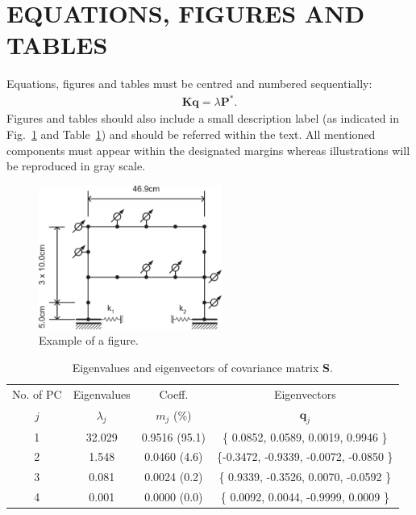\documentclass{ShortPaper_Instructions_LaTeX_IPM2019}
\begin{document}
\section{EQUATIONS, FIGURES AND TABLES}
\noindent Equations, figures and tables must be centred and numbered sequentially:
\begin{eqnarray}
	\mathbf{K q}=\lambda \mathbf{P}^\ast .
\end{eqnarray}
Figures and tables should also include a small description label (as indicated in Fig.~\ref{fig:fig1} and Table~\ref{tab:tab1}) and should be referred within the text. All mentioned components must appear within the designated margins whereas illustrations will be reproduced in gray scale.
\begin{figure}[t]
\begin{center}
\includegraphics[width=6cm]{frame_model.png}
\caption{Example of a figure.}
\label{fig:fig1}
\end{center}
\end{figure}

\begin{table}[ht]
  \begin{center}
  \caption{Eigenvalues and eigenvectors of covariance matrix \textbf{S}.}
  \label{tab:tab1}
    \begin{tabular}{*{4}{c}}
    \hline
    No. of PC & Eigenvalues & Coeff. 			& Eigenvectors \\
    $j$ 			& $\lambda_j$ & $m_j$ (\%) 	& $\mathbf{q}_j$ \\
    \hline
    1 & 32.029 & 0.9516 (95.1) &	\{ 0.0852,  0.0589,  0.0019,  0.9946 \}	\\
    2 & 1.548 & 0.0460   (4.6) &	\{-0.3472, -0.9339, -0.0072, -0.0850 \}		\\
    3 & 0.081 & 0.0024   (0.2) &	\{ 0.9339, -0.3526,  0.0070, -0.0592 \}		\\
    4	&	0.001	& 0.0000   (0.0) &	\{ 0.0092,  0.0044, -0.9999,  0.0009 \}	\\
    \hline
    \end{tabular}
  \end{center}
\end{table}
\end{document}
